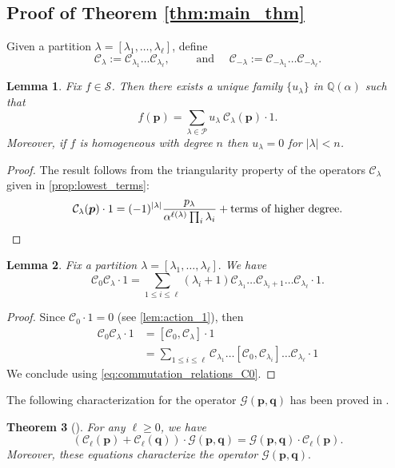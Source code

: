 \documentclass[12pt]{amsart}
\newtheorem{thm}{Theorem}[section]
\newtheorem{lem}[thm]{Lemma}
\theoremstyle{remark}
\newcommand{\bfp}{\boldsymbol{p}}
\newcommand{\bfq}{\boldsymbol{q}}
\newcommand{\G}{\mathcal G}
\newcommand{\C}{\mathcal C}
\newcommand{\QQ}{\mathbb Q}
\newcommand{\YY}{\mathcal{P}}
\newcommand{\mcSh}{\widehat{\mathcal{S}}}
\begin{document}
\subsection{Proof of Theorem \ref{thm:main_thm}}
Given a partition $\lambda=[\lambda_1,\dots,\lambda_\ell]$, define 
$$\C_\lambda:=\C_{\lambda_1}\dots\C_{\lambda_{\ell}}, \qquad \text{ and }\quad\C_{-\lambda}:=\C_{-\lambda_1}\dots\C_{-\lambda_{\ell}}.$$
\begin{lem}\label{lem:basis_C_lambda}
    Fix $f\in\mcSh$. Then there exists a unique family $\{u_\lambda\}$ in $\QQ(\alpha)$ such that 
    $$f(\bfp)=\sum_{\lambda\in\YY}u_\lambda \ \C_\lambda(\bfp)\cdot 1.$$
    Moreover, if $f$ is homogeneous with degree $n$ then $u_\lambda=0$ for $|\lambda|<n$.
\end{lem}
\begin{proof}
    The result follows from the triangularity property of the operators $\C_\lambda$ given in \cref{prop:lowest_terms}:
    \begin{equation*}
      \C_\lambda(\bfp)\cdot 1=(-1)^{|\lambda|}\frac{p_\lambda}{\alpha^{\ell(\lambda)}\prod_{i}\lambda_i}+\text{terms of higher degree}.\qedhere
    \end{equation*}
\end{proof}

\begin{lem}\label{lem:comm_C0_Clambda}
    Fix a partition $\lambda=[\lambda_1,\dots,\lambda_\ell].$ We have
    $$\C_0\C_\lambda\cdot 1=\sum_{1\leq i\leq \ell}(\lambda_i+1)\C_{\lambda_1}\dots\C_{\lambda_i+1}\dots\C_{\lambda_\ell}\cdot 1.$$
\end{lem}
\begin{proof}
    Since $\C_0\cdot 1=0$ (see \cref{lem:action_1}), then
    \begin{align*}
      \C_0\C_\lambda\cdot 1
      &=[\C_0,\C_\lambda]\cdot 1\\  
      &=\sum_{1\leq i\leq \ell}\C_{\lambda_1}\dots[\C_0,\C_{\lambda_i}]\dots\C_{\lambda_\ell}\cdot 1
    \end{align*}
    We conclude using \cref{eq:commutation_relations_C0}.
    \end{proof}



The following characterization for the operator $\G(\bfp,\bfq)$ has been proved in \cite{BenDali2025}.

\begin{thm}[{\cite[Theorem 1.6 and Proposition 6.2]{BenDali2025}}]\label{thm:characterization_G}
For any $\ell\geq 0$, we have \begin{equation}\label{eq com C-G k}
    \left(\C_{\ell}(\bfp)+\C_{\ell}(\bfq)\right)\cdot \G(\bfp,\bfq)=\G(\bfp,\bfq)\cdot \C_{\ell}(\bfp).
\end{equation}
Moreover, these equations characterize the operator $\G(\bfp,\bfq).$
\end{thm}
\end{document}

